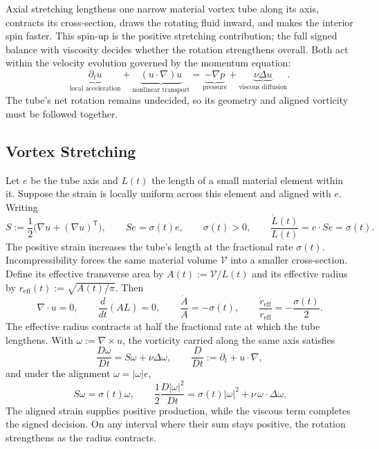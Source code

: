 
Axial stretching lengthens one narrow material vortex tube along its axis, contracts its cross-section, draws the rotating fluid inward, and makes the interior spin faster. This spin-up is the positive stretching contribution; the full signed balance with viscosity decides whether the rotation strengthens overall. Both act within the velocity evolution governed by the momentum equation:
\[
  \underbrace{\partial_t u}_{\text{local acceleration}}
  +
  \underbrace{(u\cdot\nabla)u}_{\text{nonlinear transport}}
  =
  \underbrace{-\nabla p}_{\text{pressure}}
  +
  \underbrace{\nu\Delta u}_{\text{viscous diffusion}}.
\]
The tube's net rotation remains undecided, so its geometry and aligned vorticity must be followed together.

\subsection{Vortex Stretching}\label{sub:ThePerfectlyStretchingVortex}

Let \(e\) be the tube axis and \(L(t)\) the length of a small material element within it. Suppose the strain is locally uniform across this element and aligned with \(e\). Writing
\[
  S:=\frac12\bigl(\nabla u+(\nabla u)^{\mathsf T}\bigr),
  \qquad
  Se=\sigma(t)e,
  \qquad
  \sigma(t)>0,
  \qquad
  \frac{\dot L(t)}{L(t)}
  =
  e\cdot Se
  =
  \sigma(t).
\]
The positive strain increases the tube's length at the fractional rate \(\sigma(t)\). Incompressibility forces the same material volume \(\mathcal V\) into a smaller cross-section. Define its effective transverse area by \(A(t):=\mathcal V/L(t)\) and its effective radius by \(r_{\mathrm{eff}}(t):=\sqrt{A(t)/\pi}\). Then
\[
  \nabla\cdot u=0,
  \qquad
  \frac{d}{dt}(A L)=0,
  \qquad
  \frac{\dot A}{A}=-\sigma(t),
  \qquad
  \frac{\dot r_{\mathrm{eff}}}{r_{\mathrm{eff}}}
  =
  -\frac{\sigma(t)}{2}.
\]
The effective radius contracts at half the fractional rate at which the tube lengthens. With \(\omega:=\nabla\times u\), the vorticity carried along the same axis satisfies
\[
  \frac{D\omega}{Dt}
  =
  S\omega+\nu\Delta\omega,
  \qquad
  \frac{D}{Dt}
  :=
  \partial_t+u\cdot\nabla,
\]
and under the alignment \(\omega=|\omega|e\),
\[
  S\omega
  =
  \sigma(t)\omega,
  \qquad
  \frac12\frac{D|\omega|^2}{Dt}
  =
  \sigma(t)|\omega|^2
  +
  \nu\,\omega\cdot\Delta\omega.
\]
The aligned strain supplies positive production, while the viscous term completes the signed decision. On any interval where their sum stays positive, the rotation strengthens as the radius contracts.

